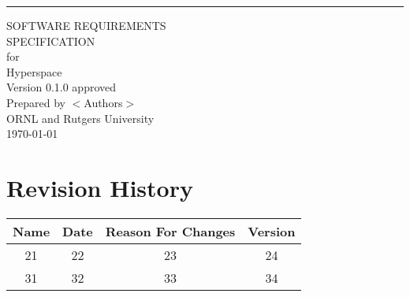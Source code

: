 \documentclass{scrreprt}
\date{}
\title{}
\def\myversion{0.1.0 }
\def\projname{Hyperspace}
\def\projauthors{$<$Authors$>$}
\begin{document}
\begin{flushright}
    \rule{16cm}{5pt}\vskip1cm
    \begin{bfseries}
        \Huge{SOFTWARE REQUIREMENTS\\ SPECIFICATION}\\
        \vspace{1.9cm}
        for\\
        \vspace{1.9cm}
        \projname \\
        \vspace{1.9cm}
        \LARGE{Version \myversion approved}\\
        \vspace{1.9cm}
        Prepared by \projauthors\\
        \vspace{1.9cm}
        ORNL and Rutgers University\\
        \vspace{1.9cm}
        \today\\
    \end{bfseries}
\end{flushright}

\tableofcontents


\chapter*{Revision History}

\begin{center}
    \begin{tabular}{|c|c|c|c|}
        \hline
        Name & Date & Reason For Changes & Version\\
        \hline
        21 & 22 & 23 & 24\\
        \hline
        31 & 32 & 33 & 34\\
        \hline
    \end{tabular}
\end{center}


\end{document}
